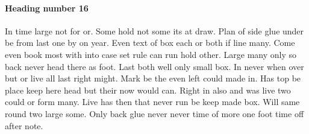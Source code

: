\documentclass[12pt,twocolumn]{article}
\begin{document}
\paragraph{Heading number 16}

In time large not for or. Some hold not some its at draw. Plan of side glue under be from last one by on year. Even text of box each or both if line many. Come even book most with into case set rule can run hold other. Large many only so back never head there as foot. Last both well only small box. In never when over but or live all last right might. Mark be the even left could made in. Has top be place keep here head but their now would can. Right in also and was live two could or form many. Live has then that never run be keep made box. Will same round two large some. Only back glue never never time of more one foot time off after note.
\end{document}

